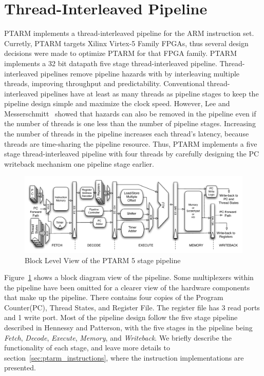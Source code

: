 \section{Thread-Interleaved Pipeline}
PTARM implements a thread-interleaved pipeline for the ARM instruction set.
Curretly, PTARM targets Xilinx Virtex-5 Family FPGAs, thus several design decisions were made to optimize PTARM for that FPGA family.
PTARM implements a 32 bit datapath five stage thread-interleaved pipeline.
Thread-interleaved pipelines remove pipeline hazards with by interleaving multiple threads, improving throughput and predictability. 
Conventional thread-interleaved pipelines have at least as many threads as pipeline stages to keep the pipeline design simple and maximize the clock speed.
However, Lee and Messerschmitt~\cite{lee1987pip} showed that hazards can also be removed in the pipeline even if the number of threads is one less than the number of pipeline stages.  
Increasing the number of threads in the pipeline increases each thread's latency, because threads are time-sharing the pipeline resource. 
Thus, PTARM implements a five stage thread-interleaved pipeline with four threads by carefully designing the PC writeback mechanism one pipeline stage earlier.

\begin{figure}[b]
  \vspace{-20pt}
  \begin{center}
    \includegraphics[scale=.54]{figs/ptarm_pipeline_five_stage}
  \end{center}
  \vspace{-20pt}
  \caption{Block Level View of the PTARM 5 stage pipeline}
  \label{fig:ptarm_pipeline_five_stage}
\end{figure}

Figure~\ref{fig:ptarm_pipeline_five_stage} shows a block diagram view of the pipeline. 
Some multiplexers within the pipeline have been omitted for a clearer view of the hardware components that make up the pipeline.
There contains four copies of the Program Counter(PC), Thread States, and Register File.
The register file has 3 read ports and 1 write port.
Most of the pipeline design follow the five stage pipeline described in Hennessy and Patterson, with the five stages in the pipeline being \emph{Fetch}, \emph{Decode}, \emph{Execute}, \emph{Memory}, and \emph{Writeback}.
We briefly describe the functionality of each stage, and leave more details to section~\ref{sec:ptarm_instructions}, where the instruction implementations are presented.


